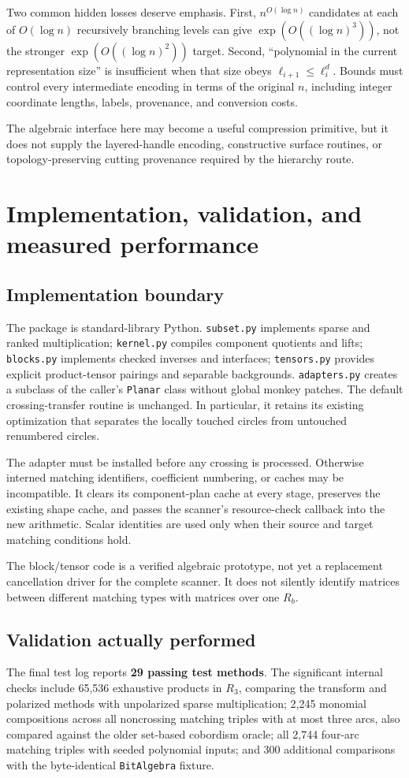 \documentclass[11pt]{article}
\theoremstyle{definition}\newtheorem{definition}[theorem]{Definition}
\theoremstyle{remark}\newtheorem{remark}[theorem]{Remark}
\newcommand{\code}[1]{\texttt{#1}}
\begin{document}
Two common hidden losses deserve emphasis. First, $n^{O(\log n)}$ candidates at each of $O(\log n)$ recursively branching levels can give $\exp(O((\log n)^3))$, not the stronger $\exp(O((\log n)^2))$ target. Second, ``polynomial in the current representation size'' is insufficient when that size obeys $\ell_{i+1}\leq\ell_i^d$. Bounds must control every intermediate encoding in terms of the original $n$, including integer coordinate lengths, labels, provenance, and conversion costs.

The algebraic interface here may become a useful compression primitive, but it does not supply the layered-handle encoding, constructive surface routines, or topology-preserving cutting provenance required by the hierarchy route.

\section{Implementation, validation, and measured performance}
\label{sec:experiments}
\subsection{Implementation boundary}
The package is standard-library Python. \code{subset.py} implements sparse and ranked multiplication; \code{kernel.py} compiles component quotients and lifts; \code{blocks.py} implements checked inverses and interfaces; \code{tensors.py} provides explicit product-tensor pairings and separable backgrounds. \code{adapters.py} creates a subclass of the caller's \code{Planar} class without global monkey patches. The default crossing-transfer routine is unchanged. In particular, it retains its existing optimization that separates the locally touched circles from untouched renumbered circles.

The adapter must be installed before any crossing is processed. Otherwise interned matching identifiers, coefficient numbering, or caches may be incompatible. It clears its component-plan cache at every stage, preserves the existing shape cache, and passes the scanner's resource-check callback into the new arithmetic. Scalar identities are used only when their source and target matching conditions hold.

The block/tensor code is a verified algebraic prototype, not yet a replacement cancellation driver for the complete scanner. It does not silently identify matrices between different matching types with matrices over one $R_b$.

\subsection{Validation actually performed}
The final test log reports \textbf{29 passing test methods}. The significant internal checks include 65,536 exhaustive products in $R_3$, comparing the transform and polarized methods with unpolarized sparse multiplication; 2,245 monomial compositions across all noncrossing matching triples with at most three arcs, also compared against the older set-based cobordism oracle; all 2,744 four-arc matching triples with seeded polynomial inputs; and 300 additional comparisons with the byte-identical \code{BitAlgebra} fixture.
\end{document}
